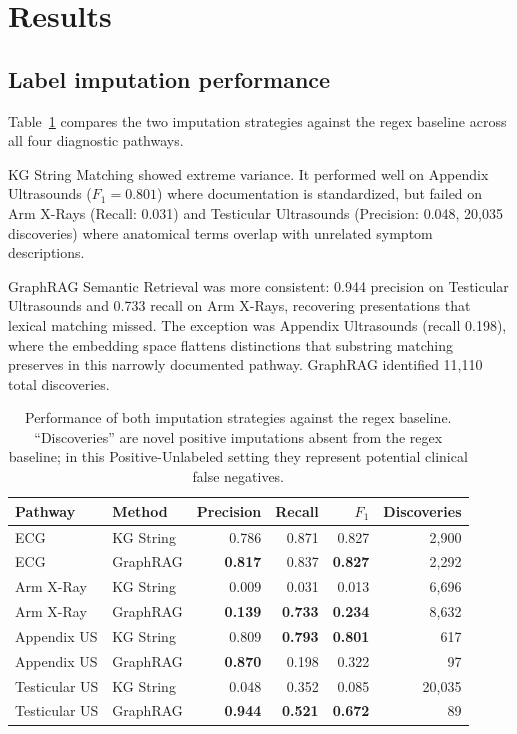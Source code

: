 \section{Results}
\label{sec:results}

\subsection{Label imputation performance}

Table~\ref{tab:imputation_results} compares the two imputation strategies against the regex baseline across all four diagnostic pathways.

KG String Matching showed extreme variance. It performed well on Appendix Ultrasounds ($F_1 = 0.801$) where documentation is standardized, but failed on Arm X-Rays (Recall: 0.031) and Testicular Ultrasounds (Precision: 0.048, 20,035 discoveries) where anatomical terms overlap with unrelated symptom descriptions.

GraphRAG Semantic Retrieval was more consistent: 0.944 precision on Testicular Ultrasounds and 0.733 recall on Arm X-Rays, recovering presentations that lexical matching missed. The exception was Appendix Ultrasounds (recall 0.198), where the embedding space flattens distinctions that substring matching preserves in this narrowly documented pathway. GraphRAG identified 11,110 total discoveries.

\begin{table}[htbp]
    \centering
    \caption{Performance of both imputation strategies against the regex baseline. ``Discoveries'' are novel positive imputations absent from the regex baseline; in this Positive-Unlabeled setting they represent potential clinical false negatives.}
    \label{tab:imputation_results}
    \small
    \begin{tabular}{llrrrr}
        \toprule
        \textbf{Pathway} & \textbf{Method} & \textbf{Precision} & \textbf{Recall} & \textbf{$F_1$} & \textbf{Discoveries} \\
        \midrule
        ECG              & KG String  & 0.786 & 0.871 & 0.827 & 2,900 \\
        ECG              & GraphRAG   & \textbf{0.817} & 0.837 & \textbf{0.827} & 2,292 \\
        \midrule
        Arm X-Ray        & KG String  & 0.009 & 0.031 & 0.013 & 6,696 \\
        Arm X-Ray        & GraphRAG   & \textbf{0.139} & \textbf{0.733} & \textbf{0.234} & 8,632 \\
        \midrule
        Appendix US      & KG String  & 0.809 & \textbf{0.793} & \textbf{0.801} & 617  \\
        Appendix US      & GraphRAG   & \textbf{0.870} & 0.198 & 0.322 & 97   \\
        \midrule
        Testicular US    & KG String  & 0.048 & 0.352 & 0.085 & 20,035 \\
        Testicular US    & GraphRAG   & \textbf{0.944} & \textbf{0.521} & \textbf{0.672} & 89  \\
        \bottomrule
    \end{tabular}
\end{table}

